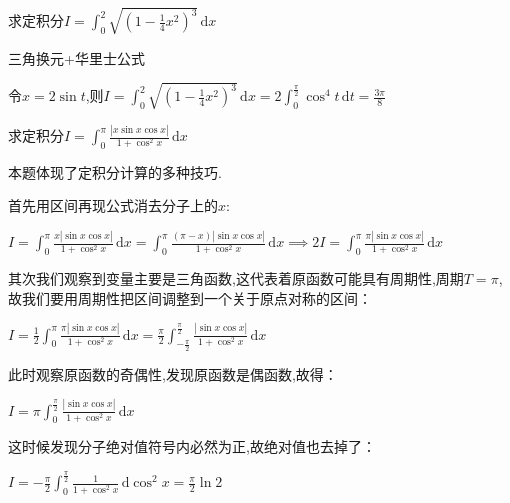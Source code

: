 \begin{examp}{求定积分$I=\int_{0}^{2} \sqrt{\left(1-\frac{1}{4}x^2\right) ^3}\,\mathrm{d}x $}
    
    \jie 三角换元+华里士公式

    令$x=2\sin t$,则$I=\int_{0}^{2} \sqrt{\left(1-\frac{1}{4}x^2\right) ^3}\,\mathrm{d}x =2 \int_{0}^{\frac{\pi}{2}} \cos^4 t \,\mathrm{d}t =\frac{3 \pi}{8}$
\end{examp}

\begin{examp}{求定积分$I=\int_{0}^{\pi} \frac{\left\lvert x \sin x \cos x\right\rvert }{1+\cos^2x} \,\mathrm{d}x $}
    
    \jie 本题体现了定积分计算的多种技巧.
    
    首先用区间再现公式消去分子上的$x$:
    
    $I=\int_{0}^{\pi} \frac{x\left\lvert  \sin x \cos x\right\rvert }{1+\cos^2x} \,\mathrm{d}x =\int_{0}^{\pi} \frac{(\pi-x)\left\lvert  \sin x \cos x\right\rvert }{1+\cos^2x} \,\mathrm{d}x \implies 2I=\int_{0}^{\pi} \frac{\pi\left\lvert  \sin x \cos x\right\rvert }{1+\cos^2x} \,\mathrm{d}x $

    其次我们观察到变量主要是三角函数,这代表着原函数可能具有周期性,周期$T=\pi$,故我们要用周期性把区间调整到一个关于原点对称的区间：
    
    $I=\frac{1}{2}\int_{0}^{\pi} \frac{\pi\left\lvert  \sin x \cos x\right\rvert }{1+\cos^2x} \,\mathrm{d}x =\frac{\pi}{2}\int_{-\frac{\pi}{2}}^{\frac{\pi}{2}} \frac{\left\lvert  \sin x \cos x\right\rvert }{1+\cos^2x} \,\mathrm{d}x $

    此时观察原函数的奇偶性,发现原函数是偶函数,故得：

    $I=\pi\int_{0}^{\frac{\pi}{2}} \frac{\left\lvert  \sin x \cos x\right\rvert }{1+\cos^2x} \,\mathrm{d}x $

    这时候发现分子绝对值符号内必然为正,故绝对值也去掉了：

    $I=-\frac{\pi}{2}\int_{0}^{\frac{\pi}{2}} \frac{1}{1+\cos^2x} \,\mathrm{d}\cos^2x =\frac{\pi}{2}\ln 2$
\end{examp}

